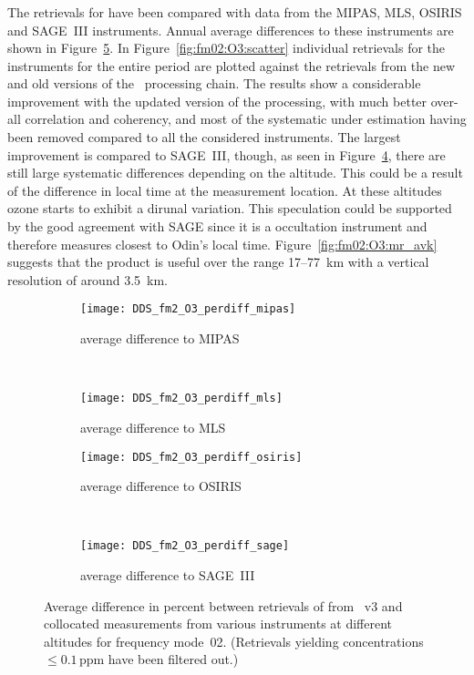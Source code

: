 \subsubsection{}
\label{sec:fm02:comparison:O3}
The retrievals for  have been compared with data from the MIPAS, MLS,
OSIRIS and SAGE~III instruments. Annual average differences to these
instruments are shown in Figure~\ref{fig:fm02:O3:profiles}. In
Figure~\ref{fig:fm02:O3:scatter} individual retrievals for the instruments for
the entire period are plotted against the retrievals from the new and old
versions of the \smr\ processing chain. The results show a considerable
improvement with the updated version of the processing, with much better
over-all correlation and coherency, and most of the systematic under
estimation having been removed compared to all the considered instruments. The
largest improvement is compared to SAGE~III, though, as seen in
Figure~\ref{fig:fm02:O3:profiles:SAGEIII}, there are still large systematic
differences depending on the altitude. This could be a result of the difference
in local time at the measurement location. At these altitudes ozone starts to
exhibit a dirunal variation. This speculation could be supported by the good
agreement with SAGE since it is a occultation instrument and therefore measures
closest to Odin's local time.  Figure~\ref{fig:fm02:O3:mr_avk} suggests that
the product is useful over the range 17--77~km with a vertical resolution of
around 3.5~km.


\begin{figure}[tbhp]
    \centering
    \begin{subfigure}[b]{0.49\textwidth}
        \texttt{[image: DDS\_fm2\_O3\_perdiff\_mipas]}
        \caption{average difference to MIPAS}
        \label{fig:fm02:O3:profiles:MIPAS}
    \end{subfigure}
    \,
    \begin{subfigure}[b]{0.49\textwidth}
        \texttt{[image: DDS\_fm2\_O3\_perdiff\_mls]}
        \caption{average difference to MLS}
        \label{fig:fm02:O3:profiles:MLS}
    \end{subfigure}

    \begin{subfigure}[b]{0.49\textwidth}
        \texttt{[image: DDS\_fm2\_O3\_perdiff\_osiris]}
        \caption{average difference to OSIRIS}
        \label{fig:fm02:O3:profiles:OSIRIS}
    \end{subfigure}
    \,
    \begin{subfigure}[b]{0.49\textwidth}
        \texttt{[image: DDS\_fm2\_O3\_perdiff\_sage]}
        \caption{average difference to SAGE~III}
        \label{fig:fm02:O3:profiles:SAGEIII}
    \end{subfigure}
    \caption{Average difference in percent between retrievals of 
    from \smr~v3 and collocated measurements from various instruments at
    different altitudes for frequency mode~02. (Retrievals yielding
    concentrations $\leq 0.1\,\mathrm{ppm}$ have been filtered out.)}

    \label{fig:fm02:O3:profiles}
\end{figure}

